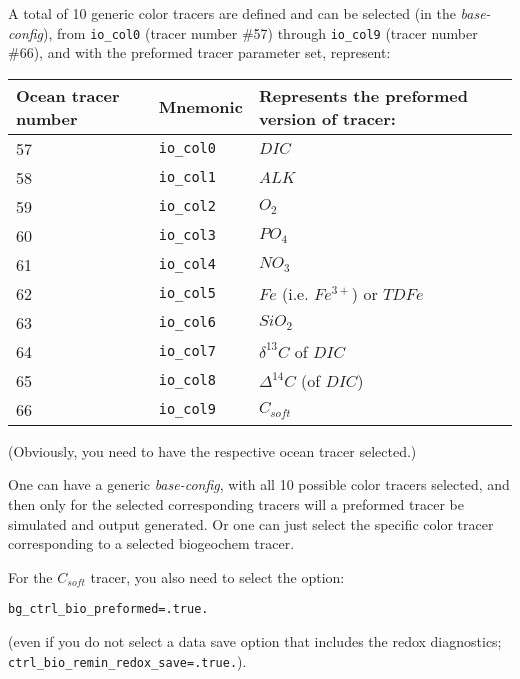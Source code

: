 \documentclass[11pt,fleqn]{book} %
\begin{document}
A total of 10 generic color tracers are defined and can be selected (in the \textit{base-config}), from \texttt{io\_col0} (tracer number \#57) through \texttt{io\_col9} (tracer number \#66), and with the preformed tracer parameter set, represent:

\begin{table}[ht]
\begin{tabular}{l l l} %
\hline\hline %
Ocean tracer number & Mnemonic & Represents the preformed version of tracer: \\ [0.5ex] %
\hline %
57 & \texttt{io\_col0} & \(DIC\) \\ 
58 & \texttt{io\_col1} & \(ALK\) \\
59 & \texttt{io\_col2} & \(O_{2}\) \\
60 & \texttt{io\_col3} & \(PO_{4}\) \\
61 & \texttt{io\_col4} & \(NO_{3}\) \\
62 & \texttt{io\_col5} & \(Fe\) (i.e. \(Fe^{3+}\)) or \(TDFe\) \\
63 & \texttt{io\_col6} & \(SiO_{2}\) \\
64 & \texttt{io\_col7} & \(\delta^{13}C\) of \(DIC\) \\
65 & \texttt{io\_col8} & \(\Delta^{14}C\) (of \(DIC\)) \\
66 & \texttt{io\_col9} & \(C_{soft}\) \\
[1pt] %
\hline %
\end{tabular}
\label{table:nonlin} %
\end{table}

\noindent (Obviously, you need to have the respective ocean tracer selected.)

One can have a generic \textit{base-config}, with all 10 possible color tracers selected, and then only for the selected corresponding tracers will a preformed tracer be simulated and output generated. Or one can just select the specific color tracer corresponding to a selected biogeochem tracer.

For the \(C_{soft}\) tracer, you also need to select the option:

\texttt{bg\_ctrl\_bio\_preformed=.true.}

\noindent (even if you do not select a data save option that includes the redox diagnostics; \linebreak \texttt{ctrl\_bio\_remin\_redox\_save=.true.}).
\end{document}
